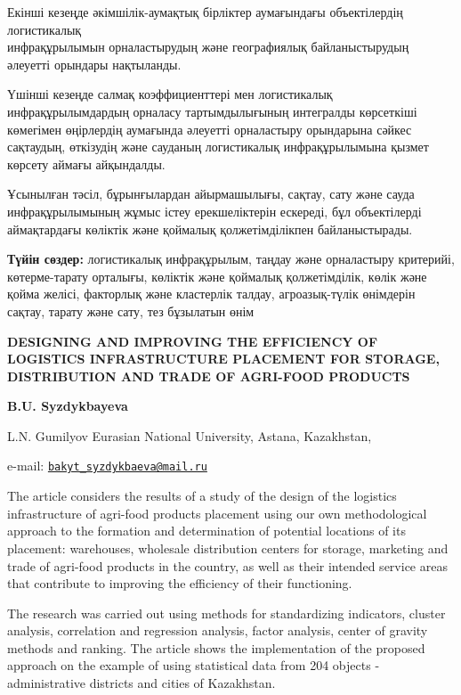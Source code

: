 Екінші кезеңде әкімшілік-аумақтық бірліктер аумағындағы объектілердің
логистикалық \\инфрақұрылымын орналастырудың және географиялық
байланыстырудың әлеуетті орындары нақтыланды.

Үшінші кезеңде салмақ коэффициенттері мен логистикалық
инфрақұрылымдардың орналасу тартымдылығының интегралды көрсеткіші
көмегімен өңірлердің аумағында әлеуетті орналастыру орындарына сәйкес
сақтаудың, өткізудің және сауданың логистикалық инфрақұрылымына қызмет
көрсету аймағы айқындалды.

Ұсынылған тәсіл, бұрынғылардан айырмашылығы, сақтау, сату және сауда
инфрақұрылымының жұмыс істеу ерекшеліктерін ескереді, бұл объектілерді
аймақтардағы көліктік және қоймалық қолжетімділікпен байланыстырады.

{\bfseries Түйін сөздер:} логистикалық инфрақұрылым, таңдау және
орналастыру критерийі, көтерме-тарату орталығы, көліктік және қоймалық
қолжетімділік, көлік және қойма желісі, факторлық және кластерлік
талдау, агроазық-түлік өнімдерін сақтау, тарату және сату, тез бұзылатын
өнім

\begin{articleheader}
{\bfseries DESIGNING AND IMPROVING THE EFFICIENCY OF LOGISTICS
INFRASTRUCTURE PLACEMENT FOR STORAGE, DISTRIBUTION AND TRADE OF
AGRI-FOOD PRODUCTS}

{\bfseries B.U. Syzdykbayeva}
\end{articleheader}

\begin{affiliation}
L.N. Gumilyov Eurasian National University, Astana, Kazakhstan,

e-mail: \href{mailto:bakyt\_syzdykbaeva@mail.ru}{\nolinkurl{bakyt\_syzdykbaeva@mail.ru}}
\end{affiliation}

The article considers the results of a study of the design of the
logistics infrastructure of agri-food products placement using our own
methodological approach to the formation and determination of potential
locations of its placement: warehouses, wholesale distribution centers
for storage, marketing and trade of agri-food products in the country,
as well as their intended service areas that contribute to improving the
efficiency of their functioning.

The research was carried out using methods for standardizing indicators,
cluster analysis, correlation and regression analysis, factor analysis,
center of gravity methods and ranking. The article shows the
implementation of the proposed approach on the example of using
statistical data from 204 objects - administrative districts and cities
of Kazakhstan.


